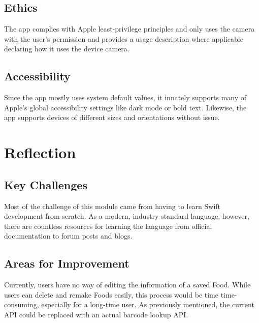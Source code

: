 \documentclass[11pt, oneside]{article}   	%
\begin{document}
\subsection{Ethics}
The app complies with Apple least-privilege principles and only uses the camera with the user's permission and provides a usage description where applicable declaring how it uses the device camera. 
\subsection{Accessibility}
Since the app mostly uses system default values, it innately supports many of Apple's global accessibility settings like dark mode or bold text. Likewise, the app supports devices of different sizes and orientations without issue.
\section{Reflection}
\subsection{Key Challenges}
Most of the challenge of this module came from having to learn Swift development from scratch. As a modern, industry-standard language, however, there are countless resources for learning the language from official documentation to forum posts and blogs.
\subsection{Areas for Improvement}
Currently, users have no way of editing the information of a saved Food. While users can delete and remake Foods easily, this process would be time time-consuming, especially for a long-time user. As previously mentioned, the current API could be replaced with an actual barcode lookup API.
\end{document}
